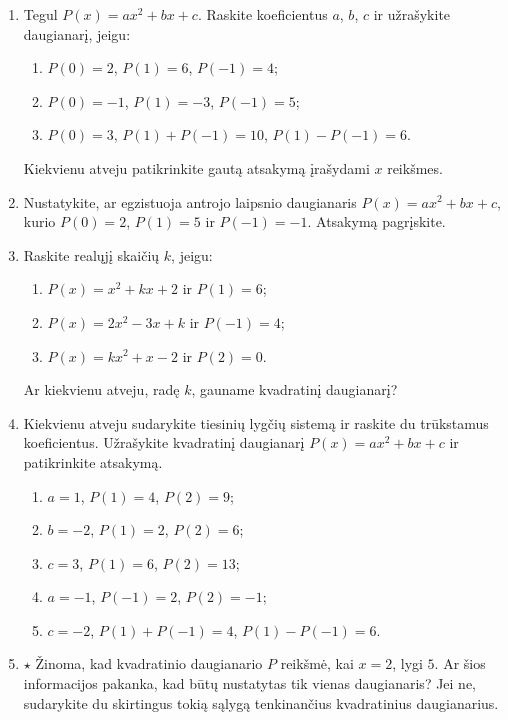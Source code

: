 \documentclass[12pt,a4paper]{exam}
\begin{document}
\begin{enumerate}
\begin{enumerate}
\item Tegul $a,b,c,a_1,b_1,c_1$ yra bet kurie realieji skaičiai, o lygybė $ax^2+bx+c=a_1x^2+b_1x+c_1$ – tapatybė. Remdamiesi \ref{koef-formules} uždaviniu įrodykite, kad $a=a_1$, $b=b_1$, $c=c_1$.
\item Paaiškinkite, kodėl to paties kvadratinio daugianario standartinio pavidalo koeficientai yra vieninteliai galimi. Ar pakaktų, kad dviejų daugianarių reikšmės sutaptų tik su viena $x$ reikšme?
\item Įrodykite, kad nėra tokių $a\ne0$, $b$, $c$, su kuriais $4x+4=ax^2+bx+c$ su kiekvienu realiuoju $x$.
\end{enumerate}
\textbf{Sustok ir apibendrink.} Ką galima pasakyti apie dviejų tapačiai lygių daugianarių atitinkamus koeficientus? Kodėl vienos bendros reikšmės nepakanka išvadai, kad daugianariai vienodi?
\item Tegul $P(x)=ax^2+bx+c$. Raskite koeficientus $a$, $b$, $c$ ir užrašykite daugianarį, jeigu:
\begin{enumerate}
\item $P(0)=2$, $P(1)=6$, $P(-1)=4$;
\item $P(0)=-1$, $P(1)=-3$, $P(-1)=5$;
\item $P(0)=3$, $P(1)+P(-1)=10$, $P(1)-P(-1)=6$.
\end{enumerate}
Kiekvienu atveju patikrinkite gautą atsakymą įrašydami $x$ reikšmes.
\item Nustatykite, ar egzistuoja antrojo laipsnio daugianaris $P(x)=ax^2+bx+c$, kurio $P(0)=2$, $P(1)=5$ ir $P(-1)=-1$. Atsakymą pagrįskite.
\item Raskite realųjį skaičių $k$, jeigu:
\begin{enumerate}
\item $P(x)=x^2+kx+2$ ir $P(1)=6$;
\item $P(x)=2x^2-3x+k$ ir $P(-1)=4$;
\item $P(x)=kx^2+x-2$ ir $P(2)=0$.
\end{enumerate}
Ar kiekvienu atveju, radę $k$, gauname kvadratinį daugianarį?
\item Kiekvienu atveju sudarykite tiesinių lygčių sistemą ir raskite du trūkstamus koeficientus. Užrašykite kvadratinį daugianarį $P(x)=ax^2+bx+c$ ir patikrinkite atsakymą.
\begin{enumerate}
\item $a=1$, $P(1)=4$, $P(2)=9$;
\item $b=-2$, $P(1)=2$, $P(2)=6$;
\item $c=3$, $P(1)=6$, $P(2)=13$;
\item $a=-1$, $P(-1)=2$, $P(2)=-1$;
\item $c=-2$, $P(1)+P(-1)=4$, $P(1)-P(-1)=6$.
\end{enumerate}
\item $\star$ Žinoma, kad kvadratinio daugianario $P$ reikšmė, kai $x=2$, lygi $5$. Ar šios informacijos pakanka, kad būtų nustatytas tik vienas daugianaris? Jei ne, sudarykite du skirtingus tokią sąlygą tenkinančius kvadratinius daugianarius.


\end{enumerate}
\end{document}
